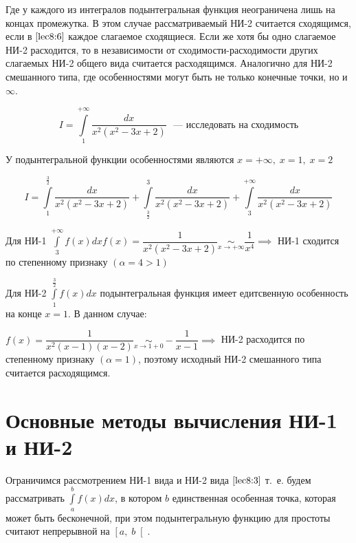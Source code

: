 \documentclass[../../main.tex]{subfiles}
\begin{document}
Где у каждого из интегралов подынтегральная функция неограничена лишь на 
концах промежутка. В этом случае рассматриваемый НИ-2 считается сходящимся, 
если в $\eqref{lec8:6}$ каждое слагаемое сходящиеся. Если же хотя бы одно 
слагаемое НИ-2 расходится, то в независимости от сходимости-расходимости 
других слагаемых НИ-2 общего вида считается расходящимся. Аналогично для НИ-2 
смешанного типа, где особенностями могут быть не только конечные точки, но и 
$\infty$.

\begin{exmp}
\[I = \int\limits_{1}^{+\infty}\dfrac{dx}{x^2(x^2 - 3x + 2)} \text{ ~--- 
исследовать на сходимость} \]

У подынтегральной функции особенностями являются $x = +\infty,\; x = 1,\; x = 
2$

\[I = \int\limits_{1}^{\frac{3}{2}}\dfrac{dx}{x^2(x^2 - 3x +2 )} + 
\int\limits_{\frac{3}{2}}^{3}\dfrac{dx}{x^2(x^2 - 3x +2 )} + 
\int\limits_{3}^{+\infty}\dfrac{dx}{x^2(x^2 - 3x +2 )}\]

Для НИ-1 $\displaystyle\int\limits_{3}^{+\infty}f(x)dx f(x) = 
\dfrac{1}{x^2(x^2 -3x + 2)} \underset{x \to +\infty} \sim \dfrac{1}{x^4} 
\implies$ НИ-1 сходится по степенному признаку $\left(\alpha = 4 > 1\right)$

Для НИ-2 $\displaystyle\int\limits_{1}^{\frac{3}{2}}f(x)dx$ подынтегральная 
функция имеет едитсвенную особенность на конце $x = 1$. В данном случае:

$f(x) = \dfrac{1}{x^2(x-1)(x-2)} \underset{x \to 1 + 0}\sim -\dfrac{1}{x - 1} 
\implies$ НИ-2 расходится по степенному признаку $\left(\alpha = 1\right)$, 
поэтому исходный НИ-2 смешанного типа считается расходящимся. 
\end{exmp}

\section{Основные методы вычисления НИ-1 и НИ-2}

Ограничимся рассмотрением НИ-1 вида и НИ-2 вида $\eqref{lec8:3}$ т.~е. будем 
рассматривать $\displaystyle\int\limits_{a}^{b}f(x)dx$, в котором $b$ 
единственная особенная точка, которая может быть бесконечной, при этом 
подынтегральную функцию для простоты считают непрерывной на $\left[a,\; 
b\right[$. 
\end{document}
